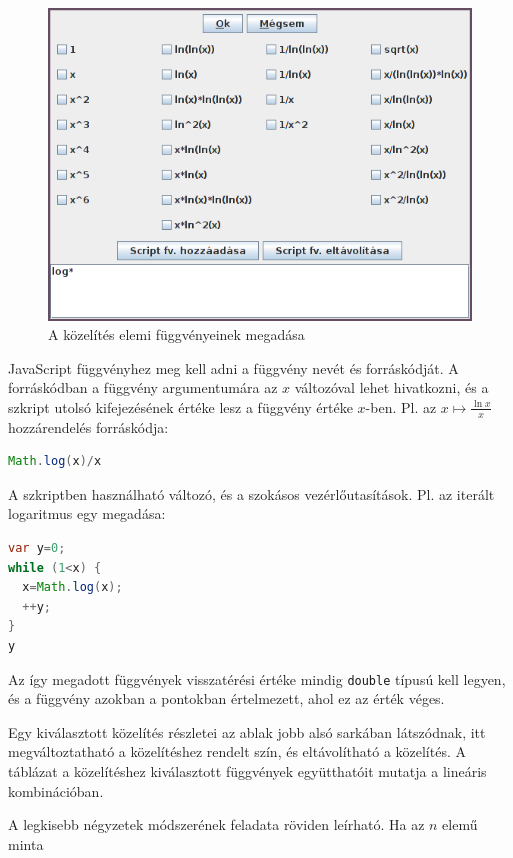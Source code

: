 \begin{figure}[H]
\caption{A közelítés elemi függvényeinek megadása}
\centering
\includegraphics[scale=0.75]{functions}
\end{figure}

JavaScript függvényhez meg kell adni a függvény nevét és forráskódját.
A forráskódban a függvény argumentumára az $x$ változóval lehet hivatkozni, és a szkript utolsó kifejezésének értéke lesz a függvény értéke $x$-ben.
Pl. az $x \mapsto \frac{\ln{x}}{x}$ hozzárendelés forráskódja:

\begin{lstlisting}[basicstyle=\small, language=Java]
Math.log(x)/x
\end{lstlisting}

A szkriptben használható változó, és a szokásos vezérlőutasítások.
Pl. az iterált logaritmus egy megadása:
\begin{lstlisting}[basicstyle=\small, language=Java,morekeywords=var]
var y=0;
while (1<x) {
  x=Math.log(x);
  ++y;
}
y
\end{lstlisting}

Az így megadott függvények visszatérési értéke mindig \texttt{double} típusú kell legyen,
és a függvény azokban a pontokban értelmezett, ahol ez az érték véges.

Egy kiválasztott közelítés részletei az ablak jobb alsó sarkában látszódnak, itt megváltoztatható a közelítéshez rendelt szín, és eltávolítható a közelítés.
A táblázat a közelítéshez kiválasztott függvények együtthatóit mutatja a lineáris kombinációban.

A legkisebb négyzetek módszerének feladata röviden leírható.
Ha az $n$ elemű minta

